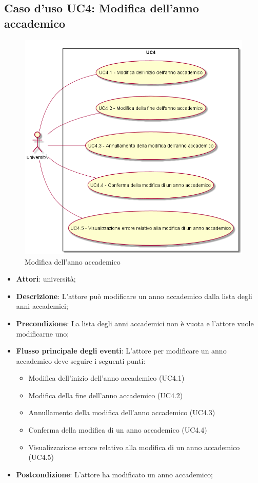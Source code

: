 \subsection{Caso d'uso \texorpdfstring{UC4}{UC4}: Modifica dell'anno accademico}
\begin{figure} [H]
\centering
\includegraphics[scale=0.45]{./img/UC4.png}
\caption{Modifica dell'anno accademico}\label{}
\end{figure}
\begin{itemize}
\item \textbf{Attori}: università;
\item \textbf{Descrizione}: L'attore può modificare un anno accademico dalla lista degli anni accademici;
\item \textbf{Precondizione}: La lista degli anni accademici non è vuota e l'attore vuole modificarne uno;
\item \textbf{Flusso principale degli eventi}: L'attore per modificare un anno accademico deve seguire i seguenti punti:
\begin{itemize}
\item Modifica dell'inizio dell'anno accademico (UC4.1)
\item Modifica della fine dell'anno accademico (UC4.2)
\item Annullamento della modifica dell'anno accademico (UC4.3)
\item Conferma della modifica di un anno accademico (UC4.4)
\item Visualizzazione errore relativo alla modifica di un anno accademico (UC4.5)
\end{itemize}
\item \textbf{Postcondizione}: L'attore ha modificato un anno accademico;
\end{itemize}

